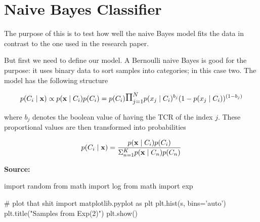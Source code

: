 \documentclass[a4paper,11pt]{article}
\begin{document}
\thispagestyle{empty}

\section*{Naive Bayes Classifier}


The purpose of this is to test how well the naive Bayes model fits the data in contrast to the one used in the research paper.

But first we need to define our model. A Bernoulli naive Bayes is good for the purpose: it uses binary data to sort samples into categories; in this case two. The model has the following structure

\[ p(C_i \mid {\bf x} ) \propto p({\bf x} \mid C_i ) p(C_i) = p(C_i)\mathlarger{\mathlarger{ \Pi }}_{j=1}^{N} p(x_j \mid C_i)^{b_j}(1 - p(x_j \mid C_i))^{(1-b_j)} \]

where $b_j$ denotes the boolean value of having the TCR of the index $j$. These proportional values are then transformed into probabilities

\[ p(C_i \mid {\bf x} ) = \frac{p({\bf x} \mid C_i ) p(C_i) }{ \Sigma_{n=1}^K p({\bf x} \mid C_n ) p(C_n)} \]


{\bf Source:}

\begin{python}
import random
from math import log
from math import exp

# plot that shit
import matplotlib.pyplot as plt
plt.hist(s, bins='auto')
plt.title("Samples from Exp(2)")
plt.show()
\end{python}
\end{document}

